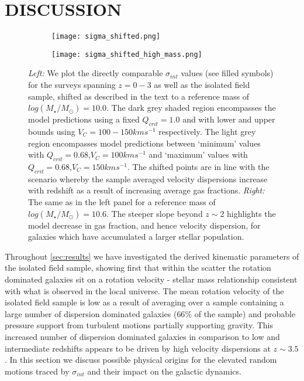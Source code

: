 \documentclass[fleqn,usenatbib]{mn2e}
\begin{document}
\section{DISCUSSION}\label{sec:discussion}


\begin{figure*}
    \centering \hspace{-1.3cm}
    \begin{subfigure}[h!]{0.5\textwidth}
        \centering
        \texttt{[image: sigma\_shifted.png]}
    \end{subfigure} \hspace{+0.4cm}
    \begin{subfigure}[h!]{0.5\textwidth}
        \centering
        \texttt{[image: sigma\_shifted\_high\_mass.png]}
    \end{subfigure}
    \caption{{\it Left:} We plot the directly comparable $\sigma_{int}$ values (see filled symbols) for the surveys spanning $z=0-3$ as well as the isolated field sample, shifted as described in the text to a reference mass of $log(M_{\star}/M_{\odot}) = 10.0$.
    The dark grey shaded region encompasses the model predictions using a fixed $Q_{crit} = 1.0$ and with lower and upper bounds using $V_{C} = 100-150kms^{-1}$ respectively.
    The light grey region encompasses model predictions between `minimum' values with $Q_{crit} = 0.68$,$V_{C}=100kms^{-1}$ and `maximum' values with $Q_{crit} = 0.68$,$V_{C}=150kms^{-1}$.
    The shifted points are in line with the scenario whereby the sample averaged velocity dispersions increase with redshift as a result of increasing average gas fractions. 
    {\it Right:} The same as in the left panel for a reference mass of $log(M_{\star}/M_{\odot}) = 10.6$.
    The steeper slope beyond $z\sim2$ highlights the model decrease in gas fraction, and hence velocity dispersion, for galaxies which have accumulated a larger stellar population.}
    \label{fig:sigma_shifted}
\end{figure*}

Throughout \cref{sec:results} we have investigated the derived kinematic parameters of the isolated field sample, showing first that within the scatter the rotation dominated galaxies sit on a rotation velocity - stellar mass relationship consistent with what is observed in the local universe.
The mean rotation velocity of the isolated field sample is low as a result of averaging over a sample containing a large number of dispersion dominated galaxies ($66\%$ of the sample) and probable pressure support from turbulent motions \citep[e.g.][]{Burkert2010} partially supporting gravity.
This increased number of dispersion dominated galaxies in comparison to low and intermediate redshifts appears to be driven by high velocity dispersions at $z\sim3.5$.
In this section we discuss possible physical origins for the elevated random motions traced by $\sigma_{int}$ and their impact on the galactic dynamics.
\end{document}
